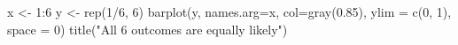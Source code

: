 \begin{Schunk}
\begin{Sinput}
 x <- 1:6
 y <- rep(1/6, 6)
 barplot(y, names.arg=x, col=gray(0.85), ylim = c(0, 1), space = 0)
 title("All 6 outcomes are equally likely")
\end{Sinput}
\end{Schunk}
